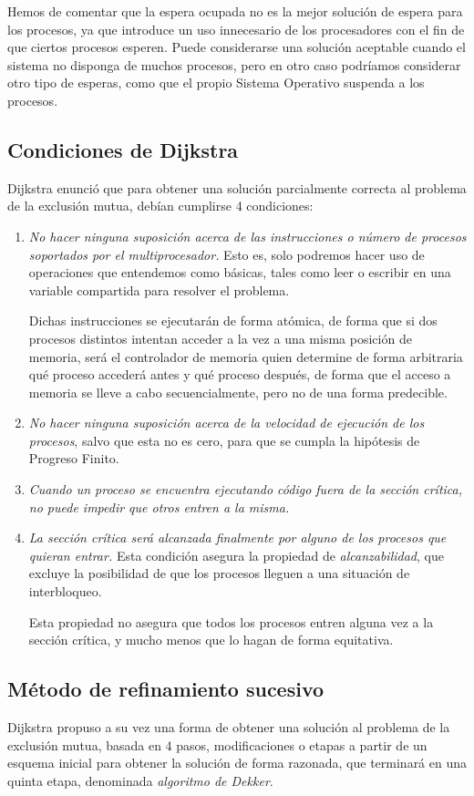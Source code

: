 Hemos de comentar que la espera ocupada no es la mejor solución de espera para los procesos, ya que introduce un uso innecesario de los procesadores con el fin de que ciertos procesos esperen. Puede considerarse una solución aceptable cuando el sistema no disponga de muchos procesos, pero en otro caso podríamos considerar otro tipo de esperas, como que el propio Sistema Operativo suspenda a los procesos.

\subsection{Condiciones de Dijkstra}
Dijkstra enunció que para obtener una solución parcialmente correcta al problema de la exclusión mutua, debían cumplirse 4 condiciones:
\begin{enumerate}
    \item \textit{No hacer ninguna suposición acerca de las instrucciones o número de procesos soportados por el multiprocesador.} Esto es, solo podremos hacer uso de operaciones que entendemos como básicas, tales como leer o escribir en una variable compartida para resolver el problema.

        Dichas instrucciones se ejecutarán de forma atómica, de forma que si dos procesos distintos intentan acceder a la vez a una misma posición de memoria, será el controlador de memoria quien determine de forma arbitraria qué proceso accederá antes y qué proceso después, de forma que el acceso a memoria se lleve a cabo secuencialmente, pero no de una forma predecible.
    \item \textit{No hacer ninguna suposición acerca de la velocidad de ejecución de los procesos}, salvo que esta no es cero, para que se cumpla la hipótesis de Progreso Finito.
    \item \textit{Cuando un proceso se encuentra ejecutando código fuera de la sección crítica, no puede impedir que otros entren a la misma.}
    \item \textit{La sección crítica será alcanzada finalmente por alguno de los procesos que quieran entrar.} Esta condición asegura la propiedad de \textit{alcanzabilidad}, que excluye la posibilidad de que los procesos lleguen a una situación de interbloqueo.

        Esta propiedad no asegura que todos los procesos entren alguna vez a la sección crítica, y mucho menos que lo hagan de forma equitativa.
\end{enumerate}

\subsection{Método de refinamiento sucesivo}
Dijkstra propuso a su vez una forma de obtener una solución al problema de la exclusión mutua, basada en 4 pasos, modificaciones o etapas a partir de un esquema inicial para obtener la solución de forma razonada, que terminará en una quinta etapa, denominada \textit{algoritmo de Dekker}.

